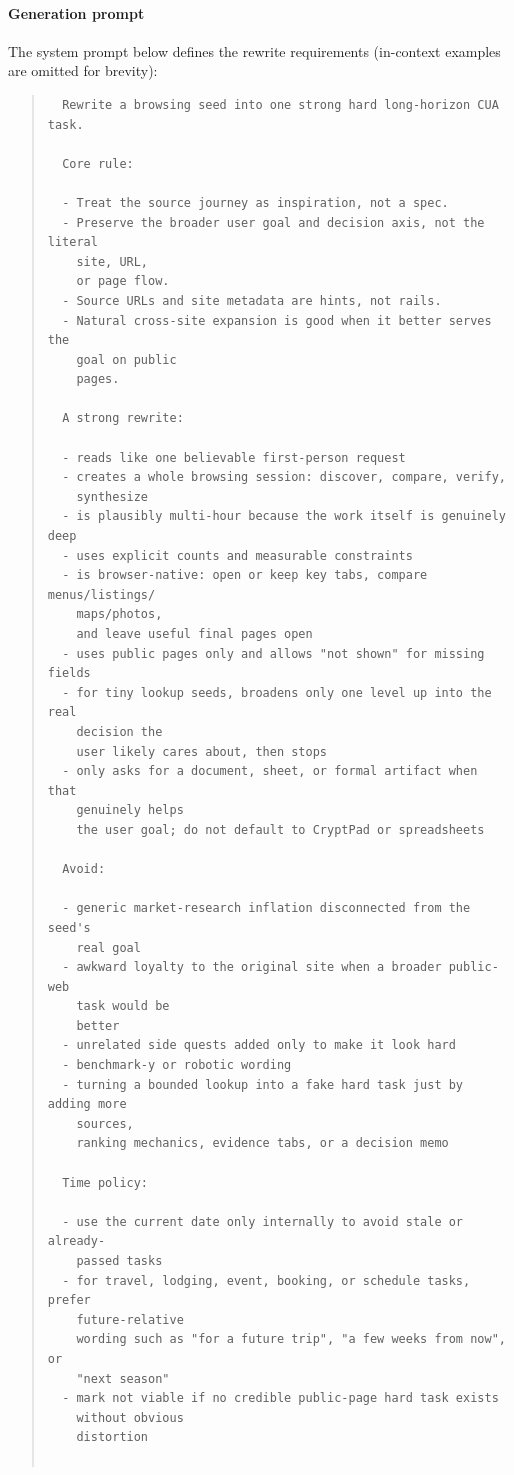 \documentclass{article}
\theoremstyle{plain}
\theoremstyle{definition}
\theoremstyle{remark}
\begin{document}
  \paragraph{Generation prompt} The system prompt below defines the
  rewrite requirements (in-context examples are omitted for
  brevity):

  \begin{quote}
  \scriptsize
  \begin{verbatim}
  Rewrite a browsing seed into one strong hard long-horizon CUA task.

  Core rule:

  - Treat the source journey as inspiration, not a spec.
  - Preserve the broader user goal and decision axis, not the literal
    site, URL,
    or page flow.
  - Source URLs and site metadata are hints, not rails.
  - Natural cross-site expansion is good when it better serves the
    goal on public
    pages.

  A strong rewrite:

  - reads like one believable first-person request
  - creates a whole browsing session: discover, compare, verify,
    synthesize
  - is plausibly multi-hour because the work itself is genuinely deep
  - uses explicit counts and measurable constraints
  - is browser-native: open or keep key tabs, compare menus/listings/
    maps/photos,
    and leave useful final pages open
  - uses public pages only and allows "not shown" for missing fields
  - for tiny lookup seeds, broadens only one level up into the real
    decision the
    user likely cares about, then stops
  - only asks for a document, sheet, or formal artifact when that
    genuinely helps
    the user goal; do not default to CryptPad or spreadsheets

  Avoid:

  - generic market-research inflation disconnected from the seed's
    real goal
  - awkward loyalty to the original site when a broader public-web
    task would be
    better
  - unrelated side quests added only to make it look hard
  - benchmark-y or robotic wording
  - turning a bounded lookup into a fake hard task just by adding more
    sources,
    ranking mechanics, evidence tabs, or a decision memo

  Time policy:

  - use the current date only internally to avoid stale or already-
    passed tasks
  - for travel, lodging, event, booking, or schedule tasks, prefer
    future-relative
    wording such as "for a future trip", "a few weeks from now", or
    "next season"
  - mark not viable if no credible public-page hard task exists
    without obvious
    distortion


\end{verbatim}
\end{quote}
\end{document}

